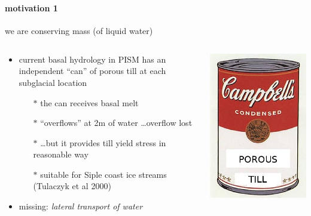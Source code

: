 \documentclass[hide notes,intlimits]{beamer}
\begin{document}
\begin{frame}
  \frametitle{\whytitle}
  \framesubtitle{motivation 1}

\vspace{-6mm}
\begin{center}
  we are  conserving mass (of liquid water)
\end{center}

\vspace{-5mm}
\begin{columns}
\begin{column}{0.5\textwidth}
  \begin{itemize}
    \item current basal hydrology in PISM has an independent ``can'' of porous till at each subglacial location %
      \begin{itemize}
        \item[$\ast$] the can receives basal melt
        \item[$\ast$] ``overflows'' at 2m of water \dots overflow lost
        \item[$\ast$] \dots but it provides till yield stress in reasonable way
        \item[$\ast$] suitable for Siple coast ice streams (Tulaczyk et al 2000) %
      \end{itemize}
    \item missing: \emph{lateral transport of water}
  \end{itemize}
\end{column}
\begin{column}{0.5\textwidth}
\begin{center}
\includegraphics[height=0.3\textheight]{figs/till-warhol-soup}


\end{center}
\end{column}
\end{columns}
\end{frame}
\end{document}
